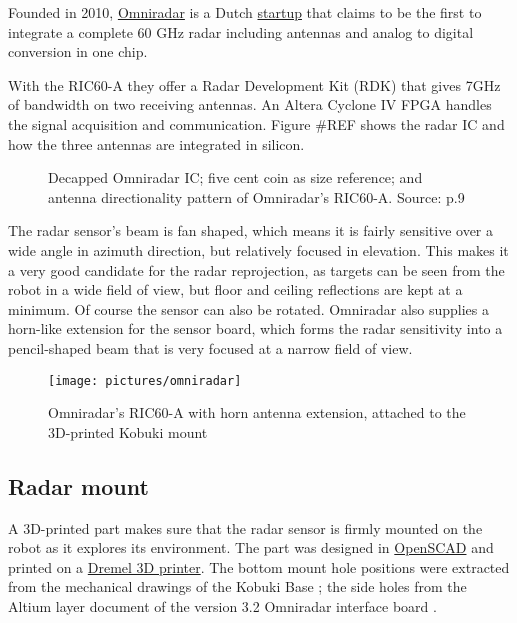 Founded in 2010, \href{https://www.omniradar.com/}{Omniradar} is a Dutch
\href{https://www.crunchbase.com/organization/omniradar}{startup} that
claims to be the first to integrate a complete 60 GHz radar including
antennas and analog to digital conversion in one chip.

With the RIC60-A they offer a Radar Development Kit (RDK) that gives
7GHz of bandwidth on two receiving antennas. An Altera Cyclone IV FPGA
handles the signal acquisition and communication. Figure \#REF shows the
radar IC and how the three antennas are integrated in silicon.

\begin{figure}[htbp]
    \centering
    \label{fig:slide_RIC60A}
    \def\svgwidth{\linewidth}
    
    \caption{Decapped Omniradar IC; five cent coin as size reference; and antenna directionality pattern of Omniradar's RIC60-A. Source: \cite{Brouwer2015} p.9}
\end{figure}

The radar sensor's beam is fan shaped, which means it is fairly
sensitive over a wide angle in azimuth direction, but relatively focused
in elevation. This makes it a very good candidate for the radar
reprojection, as targets can be seen from the robot in a wide field of
view, but floor and ceiling reflections are kept at a minimum. Of course
the sensor can also be rotated. Omniradar also supplies a horn-like
extension for the sensor board, which forms the radar sensitivity into a
pencil-shaped beam that is very focused at a narrow field of view.

\begin{figure}[htbp]
    \centering
    \label{fig:omniradar}
    \texttt{[image: pictures/omniradar]}
    \caption{Omniradar's RIC60-A with horn antenna extension, attached to the 3D-printed Kobuki mount}
\end{figure}

\subsection{Radar mount}\label{radar-mount}

A 3D-printed part makes sure that the radar sensor is firmly mounted on
the robot as it explores its environment. The part was designed in
\href{http://www.openscad.org/}{OpenSCAD} and printed on a
\href{https://3dprinter.dremel.com/}{Dremel 3D printer}. The bottom
mount hole positions were extracted from the mechanical drawings of the
Kobuki Base \cite{YujinRobot2012}; the side holes from the Altium layer
document of the version 3.2 Omniradar interface board
\cite{Omniradar2014}.

